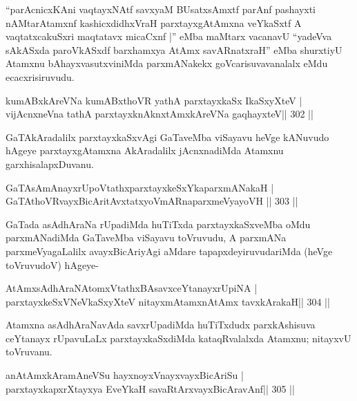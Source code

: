 \begin{artha}
``parAcnicxKAni vaqtayxNAtf savxyaM BUsatxsAmxtf parAnf pashayxti nAMtarAtamxnf kashicxdidhxVraH parxtayxgAtAmxna veYkaSxtf A vaqtatxcakuSxri maqtatavx micaCxnf |'' eMba maMtarx vacanavU ``yadeVva sAkASxda paroVkASxdf barxhamxya AtAmx savARnatxraH'' eMba shurxtiyU Atamxnu bAhayxvasutxviniMda parxmANakekx goVcarisuvavanalalx eMdu ecacxrisiruvudu.
\end{artha}

\begin{shl}
kumABxkAreVNa kumABxthoVR yathA parxtayxkaSx IkaSxyXteV | \\
vijAcnxneVna tathA parxtayxknAknxtAmxkAreVNa gaqhayxteV\hfill  ||  302 ||  
\end{shl}

\begin{artha}
GaTAkAradalilx parxtayxkaSxvAgi GaTaveMba viSayavu heVge kANuvudo hAgeye parxtayxgAtamxna AkAradalilx jAcnxnadiMda Atamxnu garxhisalapxDuvanu.
\end{artha}


\begin{shl}
GaTAsAmAnayxrUpoVtathxparxtayxkeSxYkaparxmANakaH | \\
GaTAthoVR\s vayxBicAritAvxtatxyoVmARnaparxmeVyayoVH \hfill ||  303 ||  
\end{shl}

\begin{artha}
GaTada asAdhAraNa rUpadiMda huTiTxda parxtayxkaSxveMba oMdu parxmANadiMda GaTaveMba viSayavu toVruvudu, A parxmANa parxmeVyagaLalilx avayxBicAriyAgi aMdare tapapxdeyiruvudariMda (heVge toVruvudoV) hAgeye-
\end{artha}

\begin{shl}
AtAmxsAdhAraNAtomxVtathxBAsavxceYtanayxrUpiNA | \\
parxtayxkeSxVNeVkaSxyXteV nitayxmAtamxnA\s \s tAmx tavxkArakaH\hfill  ||  304 ||  
\end{shl}

\begin{artha}
Atamxna asAdhAraNavAda savxrUpadiMda huTiTxdudx parxkAshisuva ceYtanayx rUpavuLaLx parxtayxkaSxdiMda kataqRvalalxda Atamxnu; nitayxvU toVruvanu.
\end{artha}

\begin{shl}
anAtAmxkAramAneVSu hayxnoyxVnayxvayxBicAriSu | \\
parxtayxkapxrXtayxya EveYkaH savaRtArxvayxBicAravAnf\hfill  ||  305 ||  
\end{shl}

